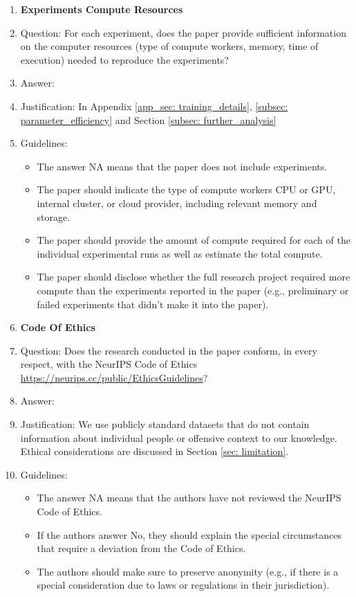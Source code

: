 \documentclass{article}
\begin{document}
\begin{enumerate}
\item {\bf Experiments Compute Resources}
    \item[] Question: For each experiment, does the paper provide sufficient information on the computer resources (type of compute workers, memory, time of execution) needed to reproduce the experiments?
    \item[] Answer: \answerYes{} %
    \item[] Justification: In Appendix \ref{app_sec: training_details}, \ref{subsec: parameter_efficiency} and Section \ref{subsec: further_analysis}
    \item[] Guidelines:
    \begin{itemize}
        \item The answer NA means that the paper does not include experiments.
        \item The paper should indicate the type of compute workers CPU or GPU, internal cluster, or cloud provider, including relevant memory and storage.
        \item The paper should provide the amount of compute required for each of the individual experimental runs as well as estimate the total compute. 
        \item The paper should disclose whether the full research project required more compute than the experiments reported in the paper (e.g., preliminary or failed experiments that didn't make it into the paper). 
    \end{itemize}
    
\item {\bf Code Of Ethics}
    \item[] Question: Does the research conducted in the paper conform, in every respect, with the NeurIPS Code of Ethics \url{https://neurips.cc/public/EthicsGuidelines}?
    \item[] Answer: \answerYes{} %
    \item[] Justification: We use publicly standard datasets that do not contain information about individual people or offensive context to our knowledge. Ethical considerations are discussed in Section \ref{sec: limitation}.
    \item[] Guidelines:
    \begin{itemize}
        \item The answer NA means that the authors have not reviewed the NeurIPS Code of Ethics.
        \item If the authors answer No, they should explain the special circumstances that require a deviation from the Code of Ethics.
        \item The authors should make sure to preserve anonymity (e.g., if there is a special consideration due to laws or regulations in their jurisdiction).
    \end{itemize}



\end{enumerate}
\end{document}
